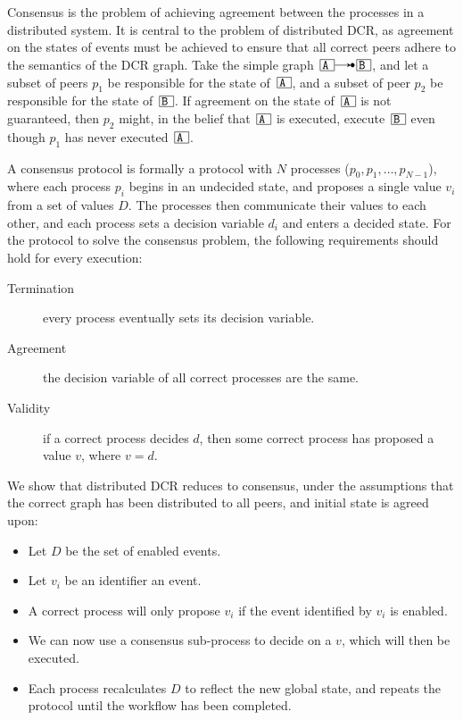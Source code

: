 \documentclass{article}
\begin{document}
		Consensus is the problem of achieving agreement between the processes in a distributed system.
		It is central to the problem of distributed DCR, as agreement on the states of events must be achieved to ensure that all correct peers adhere to the semantics of the DCR graph.
		Take the simple graph $\ev{A} \crel \ev{B}$, and let a subset of peers $p_1$ be responsible for the state of $\ev{A}$, and a subset of peer $p_2$ be responsible for the state of $\ev{B}$.
		If agreement on the state of $\ev{A}$ is not guaranteed, then $p_2$ might, in the belief that $\ev{A}$ is executed, execute $\ev{B}$ even though $p_1$ has never executed $\ev{A}$.

		A consensus protocol is formally a protocol with $N$ processes ($p_0, p_1, \dots, p_{N-1}$), where each process $p_i$ begins in an undecided state, and proposes a single value $v_i$ from a set of values $D$. The processes then communicate their values to each other, and each process sets a decision variable $d_i$ and enters a decided state.
		For the protocol to solve the consensus problem, the following requirements should hold for every execution:
		\begin{description}
			\item[Termination] every process eventually sets its decision variable.
			\item[Agreement] the decision variable of all correct processes are the same.
			\item[Validity] if a correct process decides $d$, then some correct process has proposed a value $v$, where $v = d$.
		\end{description}

		We show that distributed DCR reduces to consensus, under the assumptions that the correct graph has been distributed to all peers, and initial state is agreed upon:
		\begin{itemize}
			\item Let $D$ be the set of enabled events.
			\item Let $v_i$ be an identifier an event.
			\item A correct process will only propose $v_i$ if the event identified by $v_i$ is enabled.
			\item We can now use a consensus sub-process to decide on a $v$, which will then be executed.
			\item Each process recalculates $D$ to reflect the new global state, and repeats the protocol until the workflow has been completed.
		\end{itemize}
\end{document}
